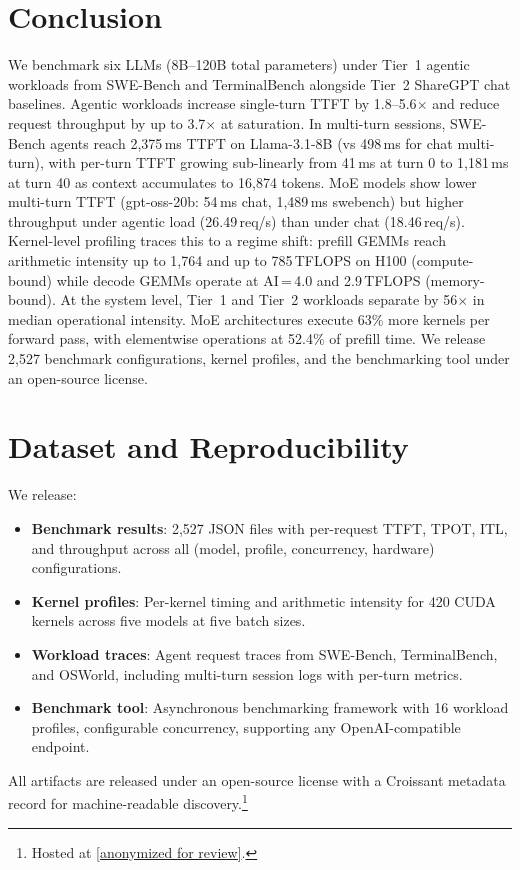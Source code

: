 \section{Conclusion}
\label{sec:conclusion}

We benchmark six LLMs (8B--120B total parameters) under Tier~1 agentic workloads from SWE-Bench and TerminalBench alongside Tier~2 ShareGPT chat baselines. Agentic workloads increase single-turn TTFT by 1.8--5.6$\times$ and reduce request throughput by up to 3.7$\times$ at saturation. In multi-turn sessions, SWE-Bench agents reach 2{,}375\,ms TTFT on Llama-3.1-8B (vs 498\,ms for chat multi-turn), with per-turn TTFT growing sub-linearly from 41\,ms at turn 0 to 1{,}181\,ms at turn 40 as context accumulates to 16{,}874 tokens. MoE models show lower multi-turn TTFT (gpt-oss-20b: 54\,ms chat, 1{,}489\,ms swebench) but higher throughput under agentic load (26.49\,req/s) than under chat (18.46\,req/s). Kernel-level profiling traces this to a regime shift: prefill GEMMs reach arithmetic intensity up to 1{,}764 and up to 785\,TFLOPS on H100 (compute-bound) while decode GEMMs operate at AI\,=\,4.0 and 2.9\,TFLOPS (memory-bound). At the system level, Tier~1 and Tier~2 workloads separate by 56$\times$ in median operational intensity. MoE architectures execute 63\% more kernels per forward pass, with elementwise operations at 52.4\% of prefill time. We release 2{,}527 benchmark configurations, kernel profiles, and the benchmarking tool under an open-source license.

\section{Dataset and Reproducibility}
\label{sec:dataset}

We release:
\begin{itemize}
    \item \textbf{Benchmark results}: 2{,}527 JSON files with per-request TTFT, TPOT, ITL, and throughput across all (model, profile, concurrency, hardware) configurations.
    \item \textbf{Kernel profiles}: Per-kernel timing and arithmetic intensity for 420 CUDA kernels across five models at five batch sizes.
    \item \textbf{Workload traces}: Agent request traces from SWE-Bench, TerminalBench, and OSWorld, including multi-turn session logs with per-turn metrics.
    \item \textbf{Benchmark tool}: Asynchronous benchmarking framework with 16 workload profiles, configurable concurrency, supporting any OpenAI-compatible endpoint.
\end{itemize}

All artifacts are released under an open-source license with a Croissant metadata record for machine-readable discovery.\footnote{Hosted at \url{[anonymized for review]}.}
